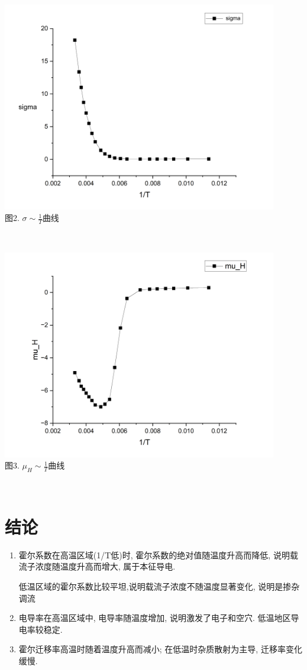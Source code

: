 \documentclass[UTF8]{ctexart}
\begin{document}
\begin{minipage}[!ht]{0.8\linewidth}
    \centering
    \includegraphics[width=0.9\textwidth]{delta.png}\\
    {\small{
        图2. $\sigma\sim\frac1T$曲线
    }}
    \vspace{10pt}
\end{minipage}\\
\begin{minipage}[!ht]{0.8\linewidth}
    \centering
    \includegraphics[width=0.9\textwidth]{mu.png}\\
    {\small{
        图3. $\mu_H\sim\frac1T$曲线
    }}
    \vspace{10pt}
\end{minipage}\\
\section{结论}
\begin{enumerate}
    \item 霍尔系数在高温区域(1/T低)时, 霍尔系数的绝对值随温度升高而降低, 说明载流子浓度随温度升高而增大, 属于本征导电.\par 低温区域的霍尔系数比较平坦,说明载流子浓度不随温度显著变化, 说明是掺杂调流
    \item 电导率在高温区域中, 电导率随温度增加, 说明激发了电子和空穴. 低温地区导电率较稳定.
    \item 霍尔迁移率高温时随着温度升高而减小; 在低温时杂质散射为主导, 迁移率变化缓慢.
\end{enumerate}
\end{document}

